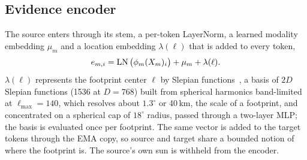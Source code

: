 \subsection{Evidence encoder}
\label{sec:encoder}

The source enters through its stem, a per-token LayerNorm, a learned modality embedding $\mu_m$ and a location embedding $\lambda(\ell)$ that is added to every token,
\begin{equation}
  e_{m,i} = \operatorname{LN}\big(\phi_m(X_m)_i\big) + \mu_m + \lambda(\ell).
\end{equation}
$\lambda(\ell)$ represents the footprint center $\ell$ by Slepian functions~\cite{simons2006spatiospectral,rao2026localized}, a basis of $2D$ Slepian functions (1536 at $D{=}768$) built from spherical harmonics band-limited at $\ell_{\max}{=}140$, which resolves about $1.3^\circ$ or 40\,km, the scale of a footprint, and concentrated on a spherical cap of $18^\circ$ radius, passed through a two-layer MLP; the basis is evaluated once per footprint. The same vector is added to the target tokens through the EMA copy, so source and target share a bounded notion of where the footprint is. The source's own sun is withheld from the encoder.

